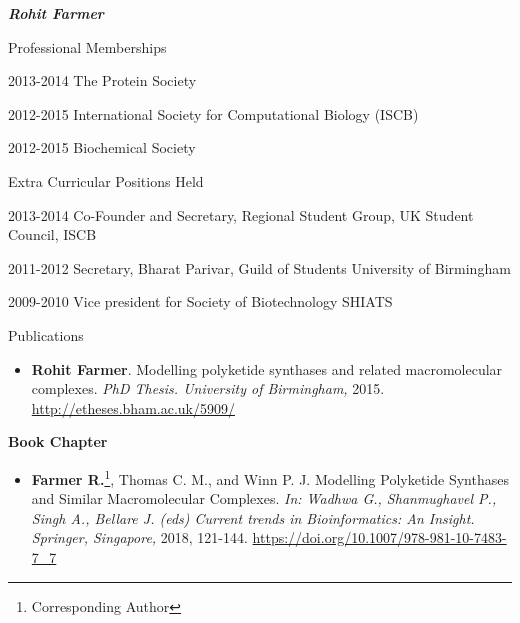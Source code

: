 \documentclass[10pt]{article}
\begin{document}
\begin{cv}{\huge \it \bfseries Rohit Farmer}
\vskip3pt
\begin{cvlist}{Professional Memberships}
	\item[2013-2014] The Protein Society
	\item[2012-2015] International Society for Computational Biology (ISCB)
	\item[2012-2015] Biochemical Society
\end{cvlist}

\vskip3pt
\begin{cvlist}{Extra Curricular Positions Held}
	\item[2013-2014] Co-Founder and Secretary, Regional Student Group, UK \hfill Student Council, ISCB
	\item[2011-2012] Secretary, Bharat Parivar, Guild of Students \hfill University of Birmingham
	\item[2009-2010] Vice president for Society of Biotechnology \hfill SHIATS
\end{cvlist}

\renewenvironment{thebibliography}[1]{
\setlength{\topsep}{0em}
\setlength{\labelsep}{.5em}
\begin{etaremune}{
\setlength{\itemsep}{0.5em}}
}{\end{etaremune}}
\renewcommand{\bibitem}[1]{\item}

\setlength{\cvlabelsep}{0mm}
\setlength{\cvlabelwidth}{0mm}
\renewcommand{\labelitemi}{}

\vspace{1em}

\begin{cvlist}{Publications}

\item {\begin{itemize}\item{\bf Rohit Farmer}. Modelling polyketide synthases and related macromolecular complexes. \emph{PhD Thesis. University of Birmingham,} 2015. \url{http://etheses.bham.ac.uk/5909/} \end{itemize}}

\vskip3pt
\item {\textbf{Book Chapter}}
\item {\begin{itemize}\item{\bf Farmer R.}\footnote{Corresponding Author}, Thomas C. M., and Winn P. J. Modelling Polyketide Synthases and Similar Macromolecular Complexes. \emph{In: Wadhwa G., Shanmughavel P., Singh A., Bellare J. (eds) Current trends in Bioinformatics: An Insight. Springer, Singapore,} 2018, 121-144. \url{https://doi.org/10.1007/978-981-10-7483-7_7} \end{itemize}}


\end{cvlist}
\end{cv}
\end{document}
